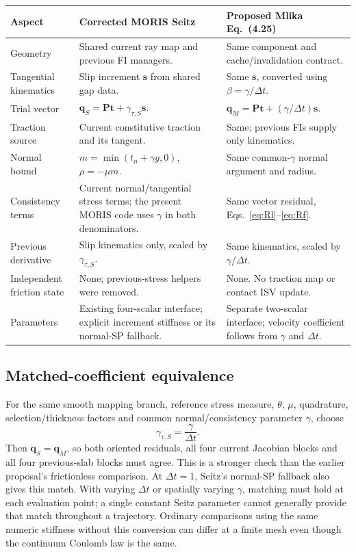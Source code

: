 \documentclass[11pt,a4paper]{article}
\newcommand{\vt}{\bm t}
\newcommand{\vq}{\bm q}
\newcommand{\vs}{\bm s}
\newcommand{\Proj}{\bm P}
\begin{document}
\begingroup\small
\setlength{\tabcolsep}{4pt}
\begin{longtable}{>{\raggedright\arraybackslash}p{}
>{\raggedright\arraybackslash}p{}
>{\raggedright\arraybackslash}p{}}
\toprule
Aspect & Corrected MORIS Seitz & Proposed Mlika Eq.~(4.25)\\
\midrule\endhead
Geometry & Shared current ray map and previous FI managers.
 & Same component and cache/invalidation contract.\\[3pt]
Tangential kinematics & Slip increment $\vs$ from shared gap data.
 & Same $\vs$, converted using $\beta=\gamma/\Delta t$.\\[3pt]
Trial vector & $\vq_S=\Proj\vt+\gamma_{\tau,S}\vs$.
 & $\vq_M=\Proj\vt+(\gamma/\Delta t)\vs$.\\[3pt]
Traction source & Current constitutive traction and its tangent.
 & Same; previous FIs supply only kinematics.\\[3pt]
Normal bound & $m=\min(t_n+\gamma g,0)$, $\rho=-\mu m$.
 & Same common-$\gamma$ normal argument and radius.\\[3pt]
Consistency terms & Current normal/tangential stress terms; the present MORIS code uses $\gamma$ in both denominators.
 & Same vector residual, Eqs.~\eqref{eq:Rl}--\eqref{eq:Rf}.\\[3pt]
Previous derivative & Slip kinematics only, scaled by $\gamma_{\tau,S}$.
 & Same kinematics, scaled by $\gamma/\Delta t$.\\[3pt]
Independent friction state & None; previous-stress helpers were removed.
 & None. No traction map or contact ISV update.\\[3pt]
Parameters & Existing four-scalar interface; explicit increment stiffness or its normal-SP fallback.
 & Separate two-scalar interface; velocity coefficient follows from $\gamma$ and $\Delta t$.\\
\bottomrule
\end{longtable}
\endgroup

\subsection{Matched-coefficient equivalence}
For the same smooth mapping branch, reference stress measure, $\theta$, $\mu$,
quadrature, selection/thickness factors and common normal/consistency parameter
$\gamma$, choose
\begin{equation}\label{eq:match}
 \gamma_{\tau,S}=\frac{\gamma}{\Delta t}.
\end{equation}
Then $\vq_S=\vq_M$, so both oriented residuals, all four current Jacobian
blocks and all four previous-slab blocks must agree. This is a stronger check
than the earlier proposal's frictionless comparison. At $\Delta t=1$, Seitz's
normal-SP fallback also gives this match. With varying $\Delta t$ or spatially
varying $\gamma$, matching must hold at each evaluation point; a single constant
Seitz parameter cannot generally provide that match throughout a trajectory.
Ordinary comparisons using the same numeric stiffness without this conversion
can differ at a finite mesh even though the continuum Coulomb law is the same.
\end{document}
